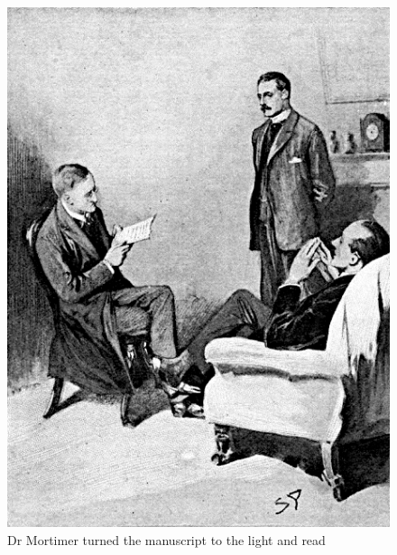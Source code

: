 \documentclass[paper=a5,BCOR=7mm,twoside,DIV=calc,12pt,usegeometry,openany,chapterprefix,endperiod,headings=big]{scrbook} %
\begin{document}
\tableofcontents
\thispagestyle{empty}
\clearpage
\vfill
\begin{figure}[ph!]
\centering
\includegraphics[width=\linewidth]{02_storyread}
\caption{Dr Mortimer turned the manuscript to the light and read}
\end{figure}
\vfill
\thispagestyle{empty}
\clearpage


\pagestyle{headings}
\renewcommand*{\chapterpagestyle}{plain}

\end{document}
